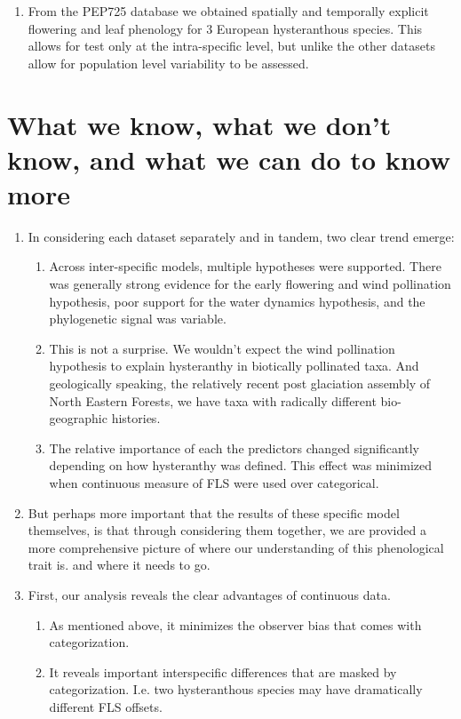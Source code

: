 \documentclass[12pt]{article}\usepackage[]{graphicx}\usepackage[]{color}
\begin{document}
\begin{enumerate}
\begin{enumerate}
\item From the PEP725 database we obtained spatially and temporally explicit flowering and leaf phenology for 3 European hysteranthous species. This allows for test only at the intra-specific level, but unlike the other datasets allow for population level variability to be assessed.
\end{enumerate}
\end{enumerate}
\section*{What we know, what we don't know, and what we can do to know more}
\begin{enumerate}
\item In considering each dataset separately and in tandem, two clear trend emerge: 
\begin{enumerate}
\item Across inter-specific models, multiple hypotheses were supported. There was generally strong evidence for the early flowering and wind pollination hypothesis, poor support for the water dynamics hypothesis, and the phylogenetic signal was variable.
\item This is not a surprise. We wouldn't expect the wind pollination hypothesis to explain hysteranthy in biotically pollinated taxa. And geologically speaking, the relatively recent post glaciation assembly of North Eastern Forests, we have taxa with radically different bio-geographic histories. 
\item The relative importance of each the predictors changed significantly depending on how hysteranthy was defined. This effect was minimized when continuous measure of FLS were used over categorical.
\end{enumerate}
\item But perhaps more important that the results of these specific model themselves, is that through considering them together, we are provided a more comprehensive picture of where our understanding of this phenological trait is. and where it needs to go.
\item First, our analysis reveals the clear advantages of continuous data.
\begin{enumerate}
\item As mentioned above, it minimizes the observer bias that comes with categorization.
\item It reveals important interspecific differences that are masked by categorization. I.e. two hysteranthous species may have dramatically different FLS offsets.

\end{enumerate}
\end{enumerate}
\end{document}
